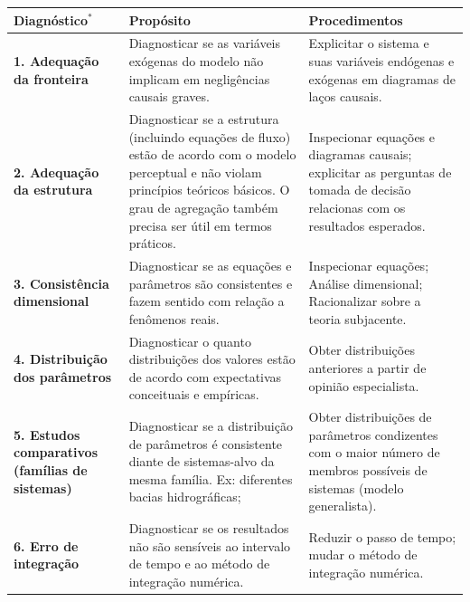 \documentclass[./main.tex]{subfiles}
\begin{document}
{\renewcommand{\arraystretch}{1.5}%
\begin{table}[t!]
    \centering	
    \tiny
    \sffamily
    \begin{tabular}{ 
 >{\raggedright\arraybackslash}m{2.75cm}  
 >{\raggedright\arraybackslash}m{5cm}  
 >{\raggedright\arraybackslash}m{5cm}}
        \toprule
        \textbf{Diagnóstico}$^*$& \textbf{Propósito}& \textbf{Procedimentos}\\ 
        \midrule
        \textbf{1. Adequação da fronteira} & Diagnosticar se as variáveis exógenas do modelo não implicam em negligências causais graves.& Explicitar o sistema e suas variáveis endógenas e exógenas em diagramas de laços causais.\\         
        
        \textbf{2. Adequação da estrutura} & Diagnosticar se a estrutura (incluindo equações de fluxo) estão de acordo com o modelo perceptual e não violam princípios teóricos básicos. O grau de agregação também precisa ser útil em termos práticos.& 
        Inspecionar equações e diagramas causais; explicitar as perguntas de tomada de decisão relacionas com os resultados esperados.\\        
        
        \textbf{3. Consistência dimensional} & Diagnosticar se as equações e parâmetros são consistentes e fazem sentido com relação a fenômenos reais.& 
        Inspecionar equações; Análise dimensional; Racionalizar sobre a teoria subjacente.\\ 
        
        \textbf{4. Distribuição dos parâmetros} & Diagnosticar o quanto distribuições dos valores estão de acordo com expectativas conceituais e empíricas.& Obter distribuições anteriores a partir de opinião especialista.\\        
        
        \textbf{5. Estudos comparativos (famílias de sistemas)} & Diagnosticar se a distribuição de parâmetros é consistente diante de sistemas-alvo da mesma família. Ex: diferentes bacias hidrográficas;& Obter distribuições de parâmetros condizentes com o maior número de membros possíveis de sistemas (modelo generalista).\\        
        
        \textbf{6. Erro de integração} & Diagnosticar se os resultados não são sensíveis ao intervalo de tempo e ao método de integração numérica.& Reduzir o passo de tempo; mudar o método de integração numérica.\\        
        

\end{tabular}
\end{table}}
\end{document}
